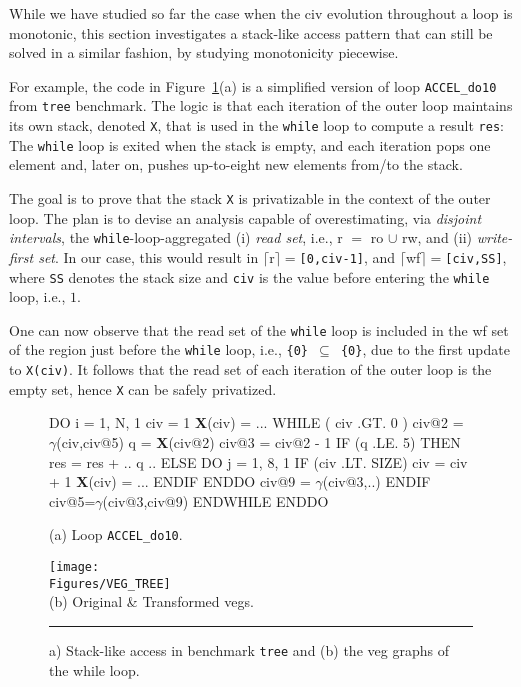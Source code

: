 \documentclass{sig-alternate}
\newcommand{\mymath}[1]{$ #1 $}
\newcommand{\Figures}[1]{../Figures/}
\begin{document}
While we have studied so far the case when the {\sc civ} evolution
throughout a loop is monotonic, this section investigates a stack-like 
access pattern that can still be solved in a similar fashion, by 
studying monotonicity piecewise.
 
For example, the code in Figure~\ref{fig:Tree}(a) is a simplified
version of loop {\tt ACCEL\_do10} from {\tt tree} benchmark. 
The logic is that each iteration of the outer loop maintains its own
stack, denoted {\tt X}, that is used in the {\tt while} loop to 
compute a result {\tt res}:
The {\tt while} loop is exited when the stack is empty, and each
iteration pops one element and, later on, pushes
up-to-eight new elements from/to the stack. 

The goal is to prove that the stack {\tt X} is privatizable in the
context of the outer loop.   The plan is to devise an analysis
capable of overestimating, via {\em disjoint intervals}, the   %
{\tt while}-loop-aggregated (i) {\em read set}, i.e., 
{\sc r} $=$ {\sc ro} $\cup$ {\sc rw}, and (ii) {\em write-first set}. 
In our case, this would result in  
$\lceil${\sc r}$\rceil=${\tt[0,civ-1]}, and
$\lceil${\sc wf}$\rceil=${\tt[civ,SS]}, where {\tt SS} denotes
the stack size and  {\tt civ} is the value before entering the 
{\tt while} loop, i.e., $1$.  

One can now observe that the read set of the {\tt while} loop 
is included in the {\sc wf} set of the region just before the 
{\tt while} loop, i.e., {\tt \{0\} $\subseteq$ \{0\}}, due to the 
first update to {\tt X(civ)}. It follows that the read set of
each iteration of the outer loop is the empty set, 
hence {\tt X} can be safely privatized. 


\begin{figure}
\begin{minipage}{0.4\columnwidth}
\begin{colorcode}
DO i = 1, N, 1
 civ = 1
 {\bf{}X}(civ) = ...
 WHILE ( civ .GT. 0 )
  civ@2 = \mymath{\gamma}(civ,civ@5)
  q = {\bf X}(civ@2)
  civ@3 = civ@2 - 1
  IF (q .LE. 5) THEN
   res = res + .. q ..
  ELSE
   DO j = 1, 8, 1
    IF (civ .LT. SIZE) 
      civ = civ + 1
      {\bf{}X}(civ) = ...
   ENDIF ENDDO
   civ@9 = \mymath{\gamma}(civ@3,..)
  ENDIF
  civ@5=\mymath{\gamma}(civ@3,civ@9)
ENDWHILE ENDDO   
\end{colorcode}
\vspace{-1ex}
(a) Loop {\tt ACCEL\_do10}.
\end{minipage}
\begin{minipage}{0.56\columnwidth}
\texttt{[image: \\Figures/VEG\_TREE]}\\
(b) Original \& Transformed {\sc veg}s.
\end{minipage}
\hrule
\caption{a) Stack-like access in benchmark {\tt tree} and (b) the {\sc veg} graphs of the while loop.}
\vspace{-1ex}
\label{fig:Tree} %
\end{figure}
\end{document}
